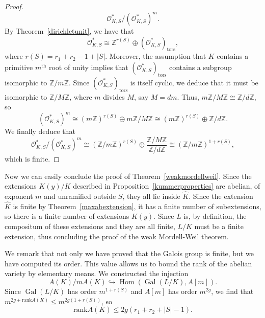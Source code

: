 \documentclass[a4paper, 12pt]{amsart}
\theoremstyle{definition}
\theoremstyle{plain}
\theoremstyle{plain}
\theoremstyle{plain}
\theoremstyle{plain}
\theoremstyle{remark}
\theoremstyle{remark}
\theoremstyle{plain}
\newcommand{\propref}[1]{Proposition~\ref{#1}}
\newcommand{\thmref}[1]{Theorem~\ref{#1}}
\newcommand{\Z}{\mathbb{Z}}
\newcommand{\Zmod}[1]{\mathbb{Z}/#1\mathbb{Z}}
\DeclareMathOperator{\Gal}{Gal}
\DeclareMathOperator{\Hom}{Hom}
\begin{document}
\begin{proof}
		\begin{equation*}
			\mathcal{O}_{K,S}^*/(\mathcal{O}_{K,S}^*)^m.
		\end{equation*}
		By \thmref{dirichletunit}, we have that
		\begin{equation*}
			\mathcal{O}_{K,S}^*\cong \Z^{r(S)}\oplus (\mathcal{O}_{K,S}^*)_{\text{tors}},
		\end{equation*}
		where $r(S)=r_1+r_2-1+|S|$. Moreover, the assumption that $K$ contains a primitive $m^{\text{th}}$ root of unity implies that $(\mathcal{O}_{K,S}^*)_{\text{tors}}$ contains a subgroup isomorphic to $\Zmod{m}$. Since $(\mathcal{O}_{K,S}^*)_{\text{tors}}$ is itself cyclic, we deduce that it must be isomorphic to $\Zmod{M}$, where $m$ divides $M$, say $M=dm$. Thus, $m\Zmod{M}\cong \Zmod{d}$, so
		\begin{equation*}
			(\mathcal{O}_{K,S}^*)^m\cong (m\Z)^{r(S)}\oplus m\Zmod{M}\cong (m\Z)^{r(S)}\oplus \Zmod{d}.
		\end{equation*}
		We finally deduce that		
		\begin{equation*}
			\mathcal{O}_{K,S}^*/(\mathcal{O}_{K,S}^*)^m\cong \left(\Zmod{m}\right)^{r(S)}\oplus \frac{\Zmod{M}}{\Zmod{d}} \cong\left(\Zmod{m}\right)^{1+r(S)},
		\end{equation*}
		which is finite.
	\end{proof}
	
	Now we can easily conclude the proof of \thmref{weakmordellweil}. Since the extensions $K(y)/K$ described in \propref{kummerproperties} are abelian, of exponent $m$ and unramified outside $S$, they all lie inside $\hat{K}$. Since the extension $\hat{K}$ is finite by \thmref{maxabextension}, it has a finite number of subextensions, so there is a finite number of extensions $K(y)$. Since $L$ is, by definition, the compositum of these extensions and they are all finite, $L/K$ must be a finite extension, thus concluding the proof of the weak Mordell-Weil theorem.
	
	We remark that not only we have proved that the Galois group is finite, but we have computed its order. This value allows us to bound the rank of the abelian variety by elementary means. We constructed the injection
	\begin{equation*}
		A(K)/mA(K)\hookrightarrow\Hom(\Gal(L/K),A[m]).
	\end{equation*}
	Since $\Gal(L/K)$ has order $m^{1+r(S)}$ and $A[m]$ has order $m^{2g}$, we find that $m^{2g+\text{rank}A(K)}\le m^{2g(1+r(S))}$, so
	\begin{equation}\label{naivebound}
		\text{rank}A(K)\le 2g(r_1+r_2+|S|-1).
	\end{equation}
	
\end{document}
